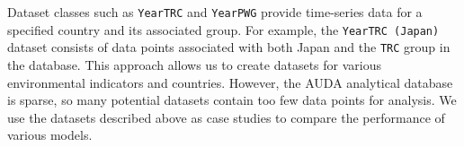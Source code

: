 Dataset classes such as \texttt{YearTRC} and \texttt{YearPWG} provide time-series data for a specified country and its associated group.
For example, the \texttt{YearTRC (Japan)} dataset consists of data points associated with both Japan and the \texttt{TRC} group in the database.
This approach allows us to create datasets for various environmental indicators and countries.
However, the AUDA analytical database is sparse, so many potential datasets contain too few data points for analysis.
We use the datasets described above as case studies to compare the performance of various models.
